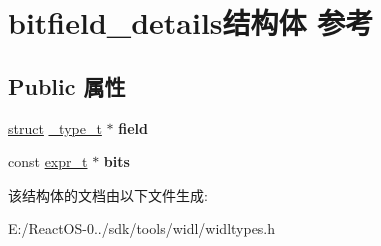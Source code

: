 \hypertarget{structbitfield__details}{}\section{bitfield\+\_\+details结构体 参考}
\label{structbitfield__details}
\subsection*{Public 属性}
\begin{DoxyCompactItemize}
\item 
\mbox{\label{structbitfield__details_a8cee88900947c60ca5cdd10a9683b32c}} 
\hyperlink{interfacestruct}{struct} \hyperlink{struct__type__t}{\+\_\+type\+\_\+t} $\ast$ {\bfseries field}
\item 
\mbox{\label{structbitfield__details_a02afbb09bb8a984d6314114b30675861}} 
const \hyperlink{struct__expr__t}{expr\+\_\+t} $\ast$ {\bfseries bits}
\end{DoxyCompactItemize}


该结构体的文档由以下文件生成\+:\begin{DoxyCompactItemize}
\item 
E\+:/\+React\+O\+S-\/0../sdk/tools/widl/widltypes.\+h\end{DoxyCompactItemize}

